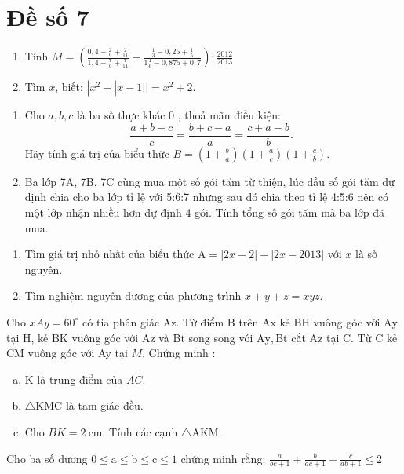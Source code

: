 \onehalfspacing
\section{Đề số 7}

\begin{bt} 
	\hfill
	\begin{enumerate}[1.]
		\item Tính $M=\left(\frac{0,4-\frac{2}{9}+\frac{2}{11}}{1,4-\frac{7}{9}+\frac{7}{11}}-\frac{\frac{1}{3}-0,25+\frac{1}{5}}{1 \frac{1}{6}-0,875+0,7}\right): \frac{2012}{2013}$
		\item Tìm $x$, biết: $\left|x^2+\right| x-1||=x^2+2$.
	\end{enumerate}
	\loigiai{} 
\end{bt}

\begin{bt}
	\hfill
	\begin{enumerate}[1.]
		\item Cho $a, b, c$ là ba số thực khác 0 , thoả mãn điều kiện:
		$$
		\frac{a+b-c}{c}=\frac{b+c-a}{a}=\frac{c+a-b}{b} \text {. }
		$$
		Hãy tính giá trị của biểu thức $B=\left(1+\frac{b}{a}\right)\left(1+\frac{a}{c}\right)\left(1+\frac{c}{b}\right)$.
		\item Ba lớp 7A, 7B, 7C cùng mua một số gói tăm từ thiện, lúc đầu số gói tăm dự định chia cho ba lớp tỉ lệ với 5:6:7 nhưng sau đó chia theo tỉ lệ 4:5:6 nên có một lớp nhận nhiều hơn dự định 4 gói. Tính tổng số gói tăm mà ba lớp đã mua.
	\end{enumerate}
	\loigiai{} 
\end{bt}

\begin{bt}
	\hfill
	\begin{enumerate}[1.]
		\item Tìm giá trị nhỏ nhất của biểu thức $\mathrm{A}=|2 x-2|+|2 x-2013|$ với $x$ là số nguyên.
		\item Tìm nghiệm nguyên dương của phương trình $x+y+z=x y z$.
	\end{enumerate}
	\loigiai{} 
\end{bt}

\begin{bt}
	Cho $x A y=60^{\circ}$ có tia phân giác $\mathrm{Az}$. Từ điểm $\mathrm{B}$ trên $\mathrm{Ax}$ kẻ $\mathrm{BH}$ vuông góc với $\mathrm{Ay}$ tại $\mathrm{H}$, kẻ $\mathrm{BK}$ vuông góc với $\mathrm{Az}$ và $\mathrm{Bt}$ song song với $\mathrm{Ay}, \mathrm{Bt}$ cắt $\mathrm{Az}$ tại $\mathrm{C}$. Từ $\mathrm{C}$ kẻ $\mathrm{CM}$ vuông góc với Ay tại $M$. Chứng minh :
	\begin{enumerate}[a.]
		\item K là trung điểm của $A C$.
		\item $\triangle \mathrm{KMC}$ là tam giác đều.
		\item Cho $B K=2 \mathrm{~cm}$. Tính các cạnh $\triangle \mathrm{AKM}$.
	\end{enumerate}
	\loigiai{}
\end{bt}

\begin{bt}
	Cho ba số dương $0 \leq \mathrm{a} \leq \mathrm{b} \leq \mathrm{c} \leq 1$ chứng minh rằng: $\frac{a}{b c+1}+\frac{b}{a c+1}+\frac{c}{a b+1} \leq 2$
\end{bt}